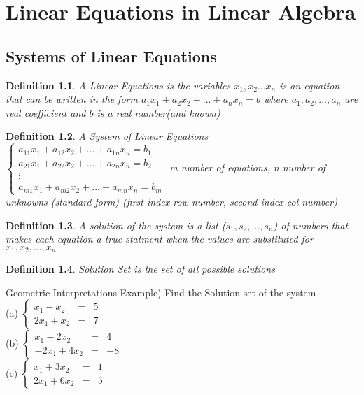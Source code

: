 \documentclass[a4paper,12pt]{book}
\theoremstyle{defn}
\newtheorem{defn}{Definition}[section]
\theoremstyle{expl}
\begin{document}
 


\chapter{Linear Equations in Linear Algebra}
\section{Systems of Linear Equations}



\begin{defn}\textup{A Linear Equations is the variables $x_1,x_2...x_n$ is an equation that can be written in the form $a_1x_1+a_2x_2+...+a_nx_n = b$ where $a_1,a_2, ..., a_n$ are real coefficient and $b$ is a real number(and known)} \end{defn}
\begin{defn}\textup{A System of Linear Equations
$\left\{ \begin{array}{c}
a_{11}x_1+a_{12}x_2+...+a_{1n}x_n = b_1\\
a_{21}x_1+a_{22}x_2+...+a_{2n}x_n = b_2\\
\vdots\\
a_{m1}x_1+a_{m2}x_2+...+a_{mn}x_n = b_m
\end{array} \right.$ m number of equations, n number of unknowns (standard form) (first index row number, second index col number)}\end{defn}
\begin{defn}\textup{A solution of the system is a list ($s_1,s_2,...,s_n$) of numbers that makes each equation a true statment when the values are substituted for $x_1,x_2,...,x_n$}\end{defn}
\begin{defn}\textup{Solution Set is the set of all possible solutions}\end{defn}

Geometric Interpretations
Example) Find the Solution set of the system \\
(a) $\left\{ \begin{array}{rcl}
x_1 - x_2 & = & 5 \\
2x_1 + x_2 & = & 7
\end{array} \right.$\\
(b) $\left\{ \begin{array}{rcl}
x_1 - 2x_2&=& 4 \\
-2x_1 + 4x_2 &=& -8
\end{array} \right.$\\
(c) $\left\{ \begin{array}{rcl}
x_1+3x_2&=&1\\
2x_1+6x_2&=&5
\end{array} \right.$
\end{document}
